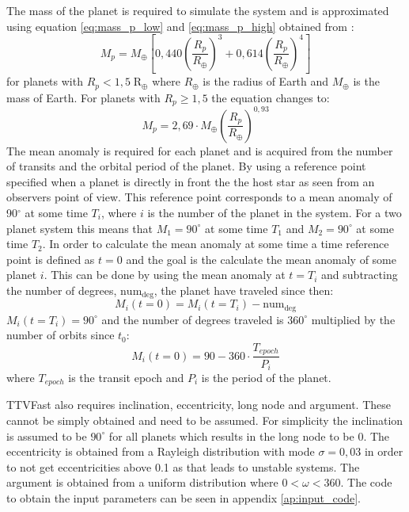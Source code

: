 \documentclass[12pt]{report}
\begin{document}
	The mass of the planet is required to simulate the system and is approximated using equation \ref{eq:mass_p_low} and \ref{eq:mass_p_high} obtained from \cite{2015ApJ...809...77S}:
	\begin{equation}
	\label{eq:mass_p_low}
	M_p = M_{\oplus} \left[0,440 \left(\frac{R_p}{R_{\oplus}}\right)^3 + 0,614\left(\frac{R_p}{R_{\oplus}}\right)^4\right]
	\end{equation}
	for planets with $R_p < 1,5 \; \mathrm{R_{\oplus}}$ where $R_{\oplus}$ is the radius of Earth and $M_{\oplus}$ is the mass of Earth. For planets with $R_p \geq 1,5$ the equation changes to:
	\begin{equation}
	\label{eq:mass_p_high}
	M_p = 2,69\cdot M_{\oplus}\left(\frac{R_p}{R_{\oplus}}\right)^{0,93}
	\end{equation}
	The mean anomaly is required for each planet and is acquired from the number of transits and the orbital period of the planet. By using a reference point specified when a planet is directly in front the the host star as seen from an observers point of view. This reference point corresponds to a mean anomaly of 90$^{\circ}$ at some time $T_i$, where $i$ is the number of the planet in the system. For a two planet system this means that $M_1=90^{\circ}$ at some time $T_1$ and $M_2=90^{\circ}$ at some time $T_2$. In order to calculate the mean anomaly at some time a time reference point is defined as $t=0$ and the goal is the calculate the mean anomaly of some planet $i$. This can be done by using the mean anomaly at $t = T_i$ and subtracting the number of degrees, $\mathrm{num_{deg}}$, the planet have traveled since then:
\begin{equation}
	M_i(t=0) = M_i(t=T_i) - \mathrm{num_{deg}}
\end{equation}
	$M_i(t=T_i) = 90^{\circ}$ and the number of degrees traveled is $360^{\circ}$ multiplied by the number of orbits since $t_0$:
\begin{equation}
	M_i(t=0) = 90 - 360\cdot \frac{T_{epoch}}{P_i}
\end{equation}
	where $T_{epoch}$ is the transit epoch and $P_i$ is the period of the planet.
	
	TTVFast also requires inclination, eccentricity, long node and argument. These cannot be simply obtained and need to be assumed. For simplicity the inclination is assumed to be $90^{\circ}$ for all planets which results in the long node to be 0. The eccentricity is obtained from a Rayleigh distribution with mode $\sigma = 0,03$ in order to not get eccentricities above 0.1 as that leads to unstable systems. The argument is obtained from a uniform distribution where $0 < \omega < 360$. The code to obtain the input parameters can be seen in appendix \ref{ap:input_code}. 
	
\end{document}
